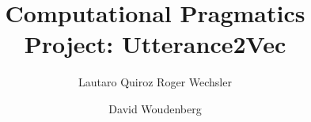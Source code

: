 

\author{\alignauthor Lautaro Quiroz 
\alignauthor Roger Wechsler  \and
\alignauthor David Woudenberg }

\title{Computational Pragmatics \\ Project: Utterance2Vec}



\maketitle








\providecommand{\bibfont}{\small}
\setlength{\bibsep}{.5pt}

\raggedright{

}

